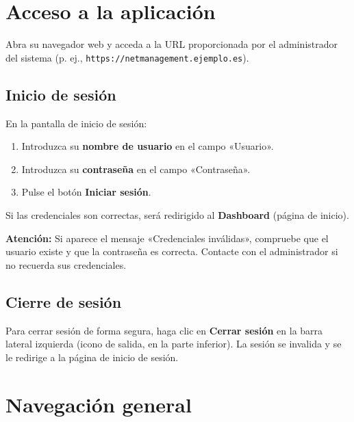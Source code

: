\documentclass[12pt,a4paper]{article}
\begin{document}
\section{Acceso a la aplicación}

Abra su navegador web y acceda a la URL proporcionada por el administrador del sistema (p. ej., \texttt{https://netmanagement.ejemplo.es}).

\subsection{Inicio de sesión}

En la pantalla de inicio de sesión:

\begin{enumerate}
    \item Introduzca su \textbf{nombre de usuario} en el campo «Usuario».
    \item Introduzca su \textbf{contraseña} en el campo «Contraseña».
    \item Pulse el botón \textbf{Iniciar sesión}.
\end{enumerate}

Si las credenciales son correctas, será redirigido al \textbf{Dashboard} (página de inicio).

\begin{warnnote}
\textbf{Atención:} Si aparece el mensaje «Credenciales inválidas», compruebe que el usuario existe y que la contraseña es correcta. Contacte con el administrador si no recuerda sus credenciales.
\end{warnnote}

\subsection{Cierre de sesión}

Para cerrar sesión de forma segura, haga clic en \textbf{Cerrar sesión} en la barra lateral izquierda (icono de salida, en la parte inferior). La sesión se invalida y se le redirige a la página de inicio de sesión.

\section{Navegación general}
\end{document}
